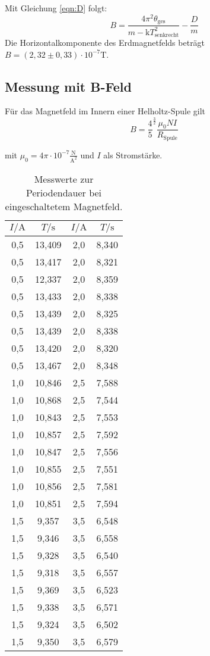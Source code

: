 Mit Gleichung \eqref{eqn:D} folgt: 
  \begin{equation}
  B = \frac{4\pi^2 \theta_\mathrm{ges}}{m-\mathrm{k}T_\mathrm{senkrecht}^2} - \frac{D}{m}
\end{equation}
Die Horizontalkomponente des Erdmagnetfelds beträgt $B=(2,32 \pm 0,33)\cdot 10^{-7}\si{\tesla}$.

\subsection{Messung mit B-Feld}

Für das Magnetfeld im Innern einer Helholtz-Spule gilt
\begin{equation}
  B=\frac{4}{5}^{\frac{3}{2}} \frac{\mu_0 N I}{R_\mathrm{Spule}}
\end{equation}

mit $\mu_0=4\pi \cdot 10^{-7} \frac{\si{\newton}}{\si{\ampere}^2}$ und $I$ als Stromstärke.

\begin{table}
  \caption{Messwerte zur Periodendauer bei eingeschaltetem Magnetfeld.}
  \centering
  \label{tab:mag}
  \begin{tabular}{c c | cc}
    \toprule
    $I/ \si{\ampere}$ & $T / \si{\second}$ & $I/ \si{\ampere}$ & $T / \si{\second}$ \\
    \midrule
    0,5 & 13,409 &	2,0 & 8,340 \\
    0,5 & 13,417 &	2,0 & 8,321 \\
    0,5 & 12,337 &	2,0 & 8,359 \\
    0,5 & 13,433 &	2,0 & 8,338 \\
    0,5 & 13,439 &	2,0 & 8,325 \\
    0,5 & 13,439 &	2,0 & 8,338 \\
    0,5 & 13,420 &	2,0 & 8,320 \\
    0,5 & 13,467 &	2,0 & 8,348 \\
    1,0 & 10,846 &	2,5 & 7,588 \\
    1,0 & 10,868 &	2,5 & 7,544 \\
    1,0 & 10,843 &	2,5 & 7,553 \\
    1,0 & 10,857 &	2,5 & 7,592 \\
    1,0 & 10,847 &	2,5 & 7,556 \\
    1,0 & 10,855 &	2,5 & 7,551 \\
    1,0 & 10,856 &	2,5 & 7,581 \\
    1,0 & 10,851 &	2,5 & 7,594 \\
    1,5 & 9,357 &	3,5 & 6,548 \\
    1,5 & 9,346 &	3,5 & 6,558 \\
    1,5 & 9,328 &	3,5 & 6,540 \\
    1,5 & 9,318 &	3,5 & 6,557 \\
    1,5 & 9,369 &	3,5 & 6,523 \\
    1,5 & 9,338 &	3,5 & 6,571 \\
    1,5 & 9,324 &	3,5 & 6,502 \\
    1,5 & 9,350 &	3,5 & 6,579 \\

\bottomrule
\end{tabular}
\end{table}

